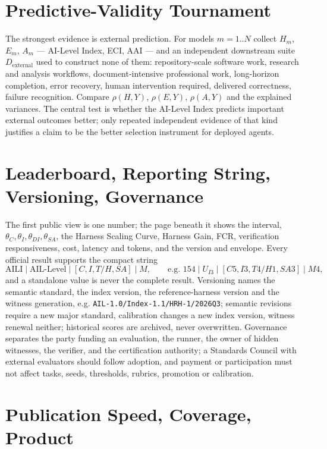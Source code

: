 \documentclass[11pt]{article}
\theoremstyle{definition}
\begin{document}
\section{Predictive-Validity Tournament}\label{sec:tournament}

The strongest evidence is external prediction. For models $m = 1..N$ collect $H_m$, $E_m$, $A_m$ --- AI-Level Index, ECI, AAI --- and an independent downstream suite $D_{\mathrm{external}}$ used to construct none of them: repository-scale software work, research and analysis workflows, document-intensive professional work, long-horizon completion, error recovery, human intervention required, delivered correctness, failure recognition. Compare $\rho(H, Y)$, $\rho(E, Y)$, $\rho(A, Y)$ and the explained variances. The central test is whether the AI-Level Index predicts important external outcomes better; only repeated independent evidence of that kind justifies a claim to be the better selection instrument for deployed agents.

\section{Leaderboard, Reporting String, Versioning, Governance}\label{sec:public}

The first public view is one number; the page beneath it shows the interval, $\theta_C, \theta_I, \theta_{DI}, \theta_{SA}$, the Harness Scaling Curve, Harness Gain, FCR, verification responsiveness, cost, latency and tokens, and the version and envelope. Every official result supports the compact string
\[
\mathrm{AILI} \mid \text{AIL-Level} \mid [C, I, T/H, SA] \mid M, \qquad \text{e.g. } 154 \mid U_{I3} \mid [C5, I3, T4/H1, SA3] \mid M4,
\]
and a standalone value is never the complete result. Versioning names the semantic standard, the index version, the reference-harness version and the witness generation, e.g. \texttt{AIL-1.0/\allowbreak Index-1.1/\allowbreak HRH-1/\allowbreak 2026Q3}; semantic revisions require a new major standard, calibration changes a new index version, witness renewal neither; historical scores are archived, never overwritten. Governance separates the party funding an evaluation, the runner, the owner of hidden witnesses, the verifier, and the certification authority; a Standards Council with external evaluators should follow adoption, and payment or participation must not affect tasks, seeds, thresholds, rubrics, promotion or calibration.

\section{Publication Speed, Coverage, Product}\label{sec:product}
\end{document}
